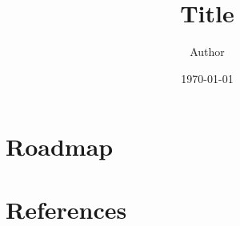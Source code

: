 \documentclass[11pt aspectratio=1610]{beamer}
\title[Short Title]{Title}
\author[Short Author]{Author}
\date{\today}
\begin{document}

\begin{frame}
    \maketitle
\end{frame}

\section*{Roadmap}
\begin{frame}
    \tableofcontents[hideothersubsections]
\end{frame}

\section*{References}
\nocite{*}
\begin{frame}


\end{frame}
\end{document}

